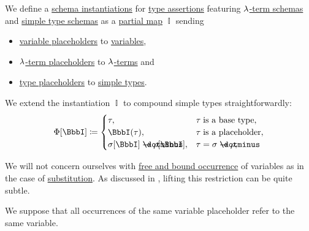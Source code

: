 \begin{definition}\label{def:lambda_schema_instantiation}
  We define a \hyperref[con:schemas_and_instances]{schema instantiations} for \hyperref[def:type_assertion]{type assertions} featuring \hyperref[def:lambda_term_schema]{\( {\mathrm \lambda} \)-term schemas} and \hyperref[def:simple_type_schema]{simple type schemas} as a \hyperref[def:set_valued_map/partial]{partial map} \( \BbbI \) sending
  \begin{itemize}
    \item \hyperref[def:lambda_term_schema]{variable placeholders} to \hyperref[def:lambda_term]{variables},
    \item \hyperref[def:lambda_term_schema]{\( {\mathrm \lambda} \)-term placeholders} to \hyperref[def:lambda_term]{\( {\mathrm \lambda} \)-terms} and
    \item \hyperref[def:simple_type_schema]{type placeholders} to \hyperref[def:simple_type]{simple types}.
  \end{itemize}

  \begin{thmenum}
     We extend the instantiation \( \BbbI \) to compound simple types straightforwardly:
    \begin{equation}\label{eq:def:lambda_schema_instantiation/types}
      \Phi[\BbbI] \coloneqq \begin{cases}
        \tau,                                  &\tau \T{is a base type},        \\
        \BbbI(\tau),                           &\tau \T{is a placeholder},      \\
        \sigma[\BbbI] \synimplies \rho[\BbbI], &\tau = \sigma \synimplies \rho, \\
      \end{cases}
    \end{equation}

     We will not concern ourselves with \hyperref[def:lambda_variable_occurrence]{free and bound occurrence} of variables as in the case of \hyperref[def:lambda_term_substitution]{substitution}. As discussed in , lifting this restriction can be quite subtle.

    We suppose that all occurrences of the same variable placeholder refer to the same variable.


\end{thmenum}
\end{definition}
